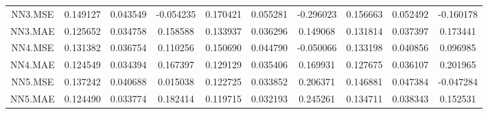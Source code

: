 \begin{longtable}{cccccccccc}
\addlinespace
NN3.MSE & 0.149127 & 0.043549 & -0.054235 & 0.170421 & 0.055281 & -0.296023 & 0.156663 & 0.052492 & -0.160178\\
NN3.MAE & 0.125652 & 0.034758 & 0.158588 & 0.133937 & 0.036296 & 0.149068 & 0.131814 & 0.037397 & 0.173441\\
NN4.MSE & 0.131382 & 0.036754 & 0.110256 & 0.150690 & 0.044790 & -0.050066 & 0.133198 & 0.040856 & 0.096985\\
NN4.MAE & 0.124549 & 0.034394 & 0.167397 & 0.129129 & 0.035406 & 0.169931 & 0.127675 & 0.036107 & 0.201965\\
NN5.MSE & 0.137242 & 0.040688 & 0.015038 & 0.122725 & 0.033852 & 0.206371 & 0.146881 & 0.047384 & -0.047284\\
\addlinespace
NN5.MAE & 0.124490 & 0.033774 & 0.182414 & 0.119715 & 0.032193 & 0.245261 & 0.134711 & 0.038343 & 0.152531\\*
\end{longtable}
\endgroup{}